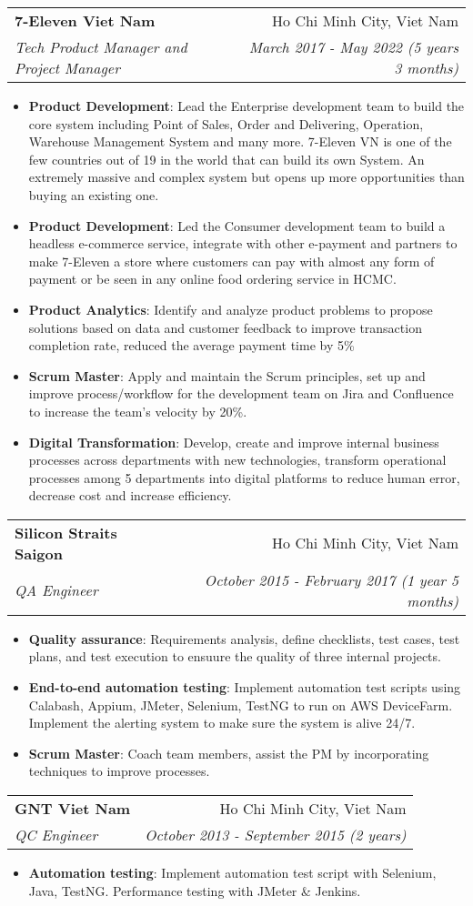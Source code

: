 \documentclass[letterpaper,11pt]{article}
\makeatletter
\newcommand{\resumeItem}[2]{
  \item\small{
    \textbf{#1}{: #2 \vspace{-2pt}}
  }
}
\newcommand{\resumeSubheading}[4]{
  \vspace{-1pt}\item
    \begin{tabular*}{0.97\textwidth}[t]{l@{\extracolsep{\fill}}r}
      \textbf{#1} & #2 \\
      \textit{\small#3} & \textit{\small #4} \\
    \end{tabular*}\vspace{-5pt}
}
\newcommand{\resumeItemListStart}{\begin{itemize}}
\newcommand{\resumeItemListEnd}{\end{itemize}\vspace{-5pt}}
\makeatother
\begin{document}
    \resumeSubheading
      {7-Eleven Viet Nam}{Ho Chi Minh City, Viet Nam}
      {Tech Product Manager and Project Manager}{March 2017 - May 2022 (5 years 3 months)}
      \resumeItemListStart
        \resumeItem{Product Development}
        {Lead the Enterprise development team to build the core system including Point of Sales, Order and Delivering, Operation, Warehouse Management System and many more. 7-Eleven VN is one of the few countries out of 19 in the world that can build its own System. An extremely massive and complex system but opens up more opportunities than buying an existing one.}
        \resumeItem{Product Development}
        {Led the Consumer development team to build a headless e-commerce service, integrate with other e-payment and partners to make 7-Eleven a store where customers can pay with almost any form of payment or be seen in any online food ordering service in HCMC.}
        \resumeItem{Product Analytics}
        {Identify and analyze product problems to propose solutions based on data and customer feedback to improve transaction completion rate, reduced the average payment time by 5\%}
        \resumeItem{Scrum Master}
        {Apply and maintain the Scrum principles, set up and improve process/workflow for the development team on Jira and Confluence to increase the team's velocity by 20\%.}
        \resumeItem{Digital Transformation}
        {Develop, create and improve internal business processes across departments with new technologies, transform operational processes among 5 departments into digital platforms to reduce human error, decrease cost and increase efficiency.}
    \resumeItemListEnd

    \resumeSubheading
      {Silicon Straits Saigon}{Ho Chi Minh City, Viet Nam}
      {QA Engineer}{October 2015 - February 2017 (1 year 5 months)}
      \resumeItemListStart
        \resumeItem{Quality assurance}
            {Requirements analysis, define checklists, test cases, test plans, and test execution to ensuure the quality of three internal projects.}
        \resumeItem{End-to-end automation testing}
            {Implement automation test scripts using Calabash, Appium, JMeter, Selenium, TestNG to run on AWS DeviceFarm. Implement the alerting system to make sure the system is alive 24/7.}
        \resumeItem{Scrum Master}
            {Coach team members, assist the PM by incorporating techniques to improve processes.}
      \resumeItemListEnd

    \resumeSubheading
      {GNT Viet Nam}{Ho Chi Minh City, Viet Nam}
      {QC Engineer}{October 2013 - September 2015 (2 years)}
      \resumeItemListStart
        \resumeItem{Automation testing}
            {Implement automation test script with Selenium, Java, TestNG. Performance testing with JMeter \& Jenkins.}
      \resumeItemListEnd
\end{document}
